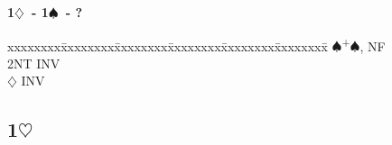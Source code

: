 \documentclass[10pt]{article}
\renewcommand{\c}{$\clubsuit$}
\renewcommand{\d}{$\diamondsuit$}
\newcommand{\h}{$\heartsuit$}
\newcommand{\s}{$\spadesuit$}
\newcommand{\p}{\textsuperscript{+}}
\newcommand{\m}{\textsuperscript{\textminus}}
\newenvironment{bidtable}[1][]
{\textbf{#1}
  \begin{adjustwidth}{1em}{}
    \addvspace{2pt}
    \begin{tabbing}
      xxxxxxxx\=xxxxxxxx\=xxxxxxxx\=xxxxxxxx\=xxxxxxxx\=xxxxxxxx\=\kill}
{\end{tabbing}\end{adjustwidth}\bigskip}%
\newcommand{\pdfh}{\texorpdfstring{\h{}}{H}}
\begin{document}
\begin{multicols*}{2}
\begin{bidtable}[1\d\ - 1\s\ - ?]
     \s  {}\p\s, NF                              \\
     \> 2NT  \> INV                                    \\
     \d  \> INV                                    %
\end{bidtable}

\newpage
\subsection{1\pdfh}



\end{multicols*}
\end{document}
